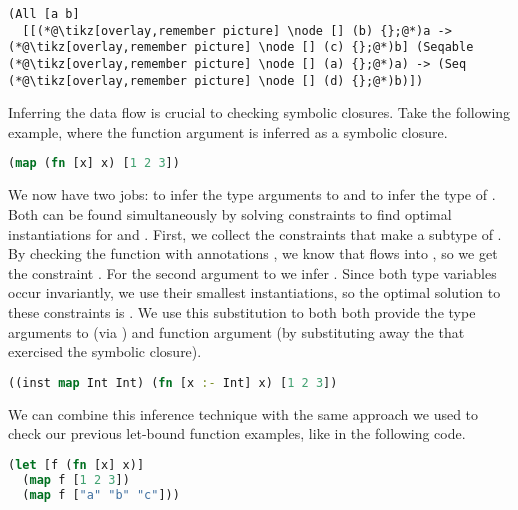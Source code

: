 \begin{lstlisting}
(All [a b]
  [[(*@\tikz[overlay,remember picture] \node [] (b) {};@*)a -> (*@\tikz[overlay,remember picture] \node [] (c) {};@*)b] (Seqable (*@\tikz[overlay,remember picture] \node [] (a) {};@*)a) -> (Seq (*@\tikz[overlay,remember picture] \node [] (d) {};@*)b)])
\end{lstlisting}

Inferring the data flow is crucial to checking symbolic closures.
Take the following example, where the function argument is inferred
as a symbolic closure.

\begin{lstlisting}[language=Clojure]
(map (fn [x] x) [1 2 3])
\end{lstlisting}

We now have two jobs: to infer the type arguments to 
and to infer the type of .
Both can be found simultaneously by solving constraints
to find optimal instantiations for  and .
First, we collect the constraints that make
a subtype of
\clj{[a -> b]}.
By checking the function with annotations
,
we know that  flows into , so
we get the constraint
.
For the second argument to 
we infer
.
Since both type variables occur invariantly, we use their smallest instantiations,
so the optimal solution to these constraints
is .
We use this substitution to both
both provide the type arguments to  (via )
and function argument (by substituting away the  that
exercised the symbolic closure).


\begin{lstlisting}[language=Clojure]
((inst map Int Int) (fn [x :- Int] x) [1 2 3])
\end{lstlisting}

We can combine this inference technique with the same approach
we used to check our previous let-bound function examples,
like in the following code.

\begin{lstlisting}[language=Clojure]
(let [f (fn [x] x)]
  (map f [1 2 3])
  (map f ["a" "b" "c"]))
\end{lstlisting}

